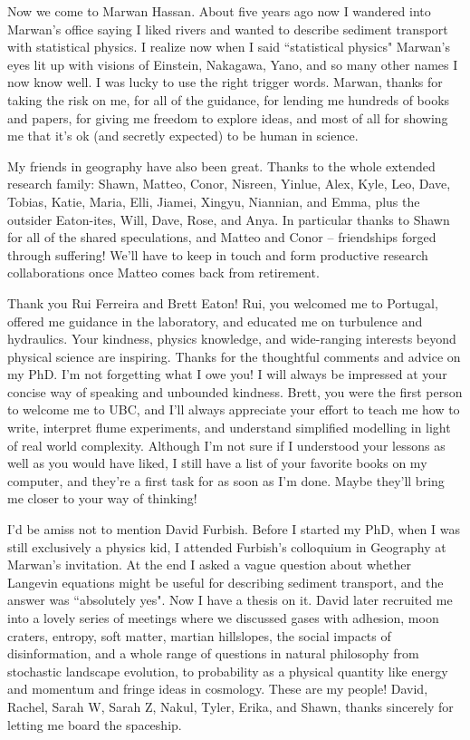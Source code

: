 Now we come to Marwan Hassan. About five years ago now I wandered into Marwan's office saying I liked rivers and wanted to describe sediment transport with statistical physics. I realize now when I said ``statistical physics" Marwan's eyes lit up with visions of Einstein, Nakagawa, Yano, and so many other names I now know well. I was lucky to use the right trigger words.
Marwan, thanks for taking the risk on me, for all of the guidance, for lending me hundreds of books and papers, for giving me freedom to explore ideas, and most of all for showing me that it's ok (and secretly expected) to be human in science. 

My friends in geography have also been great. Thanks to the whole extended research family: Shawn, Matteo, Conor, Nisreen, Yinlue, Alex, Kyle, Leo, Dave, Tobias, Katie, Maria, Elli, Jiamei, Xingyu, Niannian, and Emma, plus the outsider Eaton-ites, Will, Dave, Rose, and Anya. In particular thanks to Shawn for all of the shared speculations, and Matteo and Conor -- friendships forged through suffering! We'll have to keep in touch and form productive research collaborations once Matteo comes back from retirement.

Thank you Rui Ferreira and Brett Eaton!
Rui, you welcomed me to Portugal, offered me guidance in the laboratory, and educated me on turbulence and hydraulics. Your kindness, physics knowledge, and wide-ranging interests beyond physical science are inspiring. Thanks for the thoughtful comments and advice on my PhD. I'm not forgetting what I owe you! I will always be impressed at your concise way of speaking and unbounded kindness.
Brett, you were the first person to welcome me to UBC, and I'll always appreciate your effort to teach me how to write, interpret flume experiments, and understand simplified modelling in light of real world complexity. Although I'm not sure if I understood your lessons as well as you would have liked, I still have a list of your favorite books on my computer, and they're a first task for as soon as I'm done. Maybe they'll bring me closer to your way of thinking!

I'd be amiss not to mention David Furbish. Before I started my PhD, when I was still exclusively a physics kid, I attended Furbish's colloquium in Geography at Marwan's invitation. At the end I asked a vague question about whether Langevin equations might be useful for describing sediment transport, and the answer was ``absolutely yes". Now I have a thesis on it. David later recruited me into a lovely series of meetings where we discussed gases with adhesion, moon craters, entropy, soft matter, martian hillslopes, the social impacts of disinformation, and a whole range of questions in natural philosophy from stochastic landscape evolution, to probability as a physical quantity like energy and momentum and fringe ideas in cosmology. These are my people! David, Rachel, Sarah W, Sarah Z, Nakul, Tyler, Erika, and Shawn, thanks sincerely for letting me board the spaceship.

